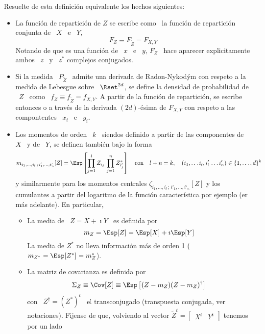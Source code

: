 Resuelte de esta definici\'on equivalente los hechos siguientes:
%
\begin{itemize}
\item La  funci\'on de repartici\'on  de $Z$ se  escribe como \ la  funci\'on de
  repartici\'on conjunta de \ $X$ \ e \ $Y$,
  \[
  F_Z \equiv F_{\widetilde{Z}} = F_{X,Y}
  \]
  Notando de  que es una  funci\'on de \  $x$ \ e \  $y$, $F_Z$ \  hace aparecer
  explicitamente ambos \ $z$ \ y \ $z^*$ complejos conjugados.
%
\item   Si  la   medida  \   $P_{\widetilde{Z}}$  \   admite  una   derivada  de
  Radon-Nykod\'ym con respeto a la medida  de Lebesgue sobre \ $\Rset^{2 d}$, se
  define  la  densidad   de  probabilidad  de  \  $Z$  \   como  \  $f_Z  \equiv
  f_{\widetilde{Z}} =  f_{X,Y}$. A partir  de la funci\'on de  repartici\'on, se
  escribe entonces o a trav\'es de  la derivada $(2 d)$-\'esima de $F_{X,Y}$ con
  respeto a las compontentes \ $x_i$ \ e \ $y_i$.
%
\item Los momentos de orden \ $k$ \ siendos definido a partir de las componentes
  de \ $X$ \ y de \ $Y$, se definen tambi\'en bajo la forma
  \[
  m_{i_1  ,  \ldots ,  i_l  \,  ;  \, i'_1  ,  \ldots  , i'_n}[Z]  =  \Esp\left[
    \prod_{j=1}^l Z_{i_j}  \, \prod_{j=1}^n Z_{i'_j}^*  \right] \quad \mbox{con}
  \quad l+n = k, \quad (i_1 , \ldots i_l , i'_1 \ldots i'_n) \in \{ 1 , \ldots , d \}^k
  \]
  y similarmente para los momentos centrales  $\zeta_{i_1 , \ldots , i_l \, ; \,
    i'_1 ,  \ldots ,  i'_n}[Z]$ y los  cumulantes a  partir del logaritmo  de la
  funci\'on caracter\'istica por ejemplo (er m\'as adelante).  En particular,
  \begin{itemize}
  \item La media de \ $Z = X + \imath Y$ \ es definida por
    \[
    m_Z = \Esp[Z] = \Esp[X] + \imath \Esp[Y]
    \]
    La  media de  $Z^*$ no  lleva  informaci\'on m\'as  de orden  1 ($m_{Z^*}  =
    \Esp[Z^*] = m_Z^*$).
  \item La matriz de covarianza es definida por
    \[
    \Sigma_Z \equiv \Cov[Z] \equiv \Esp\left[ (Z-m_Z) (Z-m_Z)^\dag \right]
    \]
    con \  $Z^\dag =  (Z^*)^t$ \ el  transconjugado (transpuesta  conjugada, ver
    notaciones).    Fijense  de  que,   volviendo  al   vector  $\widetilde{Z}^t
    = \begin{bmatrix} X^t & Y^t \end{bmatrix}$ tenemos por un lado

\end{itemize}
\end{itemize}
